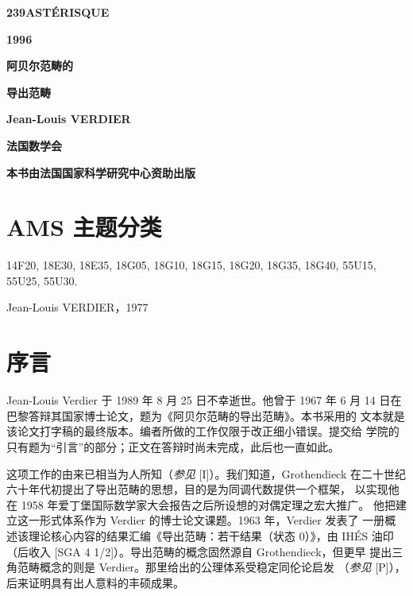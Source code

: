 \begin{titlepage}
  \centering
  {\Huge\bfseries 239\hfill ASTÉRISQUE\par}
  \vspace{1.5em}
  {\LARGE\bfseries 1996\par}
  \vfill
  {\Huge\bfseries 阿贝尔范畴的\par}
  \vspace{0.4em}
  {\Huge\bfseries 导出范畴\par}
  \vspace{3em}
  {\Large\bfseries Jean-Louis VERDIER\par}
  \vfill
  {\Large\bfseries 法国数学会\par}
  \smallskip
  {\small\bfseries 本书由法国国家科学研究中心资助出版\par}
\end{titlepage}

\chapter*{AMS 主题分类}

14F20, 18E30, 18E35, 18G05, 18G10, 18G15, 18G20, 18G35,
18G40, 55U15, 55U25, 55U30.

\clearpage
{}
\thispagestyle{empty}
\vspace*{0.62\textheight}
\begin{center}
Jean-Louis VERDIER，1977
\end{center}

\clearpage
{}
\thispagestyle{empty}
\null
\clearpage

\chapter*{序言}

Jean-Louis Verdier 于 1989 年 8 月 25 日不幸逝世。他曾于 1967 年 6 月
14 日在巴黎答辩其国家博士论文，题为《阿贝尔范畴的导出范畴》。本书采用的
文本就是该论文打字稿的最终版本。编者所做的工作仅限于改正细小错误。提交给
学院的只有题为“引言”的部分；正文在答辩时尚未完成，此后也一直如此。

这项工作的由来已相当为人所知（\emph{参见} [I]）。我们知道，Grothendieck
在二十世纪六十年代初提出了导出范畴的思想，目的是为同调代数提供一个框架，
以实现他在 1958 年爱丁堡国际数学家大会报告之后所设想的对偶定理之宏大推广。
他把建立这一形式体系作为 Verdier 的博士论文课题。1963 年，Verdier 发表了
一册概述该理论核心内容的结果汇编《导出范畴：若干结果（状态 0）》，由 IHÉS
油印（后收入 [SGA 4 1/2]）。导出范畴的概念固然源自 Grothendieck，但更早
提出三角范畴概念的则是 Verdier。那里给出的公理体系受稳定同伦论启发
（\emph{参见} [P]），后来证明具有出人意料的丰硕成果。

